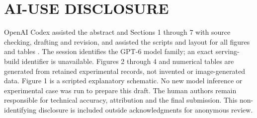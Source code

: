 \documentclass[a4paper,twoside]{article}
\begin{document}
\section*{AI-USE DISCLOSURE}
\label{sec:disclosure}
\noindent OpenAI Codex assisted the abstract and Sections 1 through 7 with source checking, drafting and revision, and assisted the scripts and layout for all figures and tables \cite{openai2026codex}. The session identifies the GPT-6 model family; an exact serving-build identifier is unavailable. Figures 2 through 4 and numerical tables are generated from retained experimental records, not invented or image-generated data. Figure 1 is a scripted explanatory schematic. No new model inference or experimental case was run to prepare this draft. The human authors remain responsible for technical accuracy, attribution and the final submission. This non-identifying disclosure is included outside acknowledgments for anonymous review.



\end{document}
